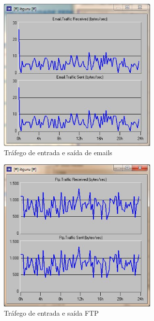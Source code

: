 \documentclass[brazil,times,12pt]{abnt}
\begin{document}
\begin{figure}[htp]
\begin{center}
  \includegraphics[width=80mm]{SimulacaoRede/TrafegoEmail.jpg}
  \caption[trafego-email]{Tráfego de entrada e saída de emails}
  \label{trafego-email}
\end{center}
\end{figure}

\begin{figure}[htp]
\begin{center}
  \includegraphics[width=80mm]{SimulacaoRede/TrafegoFTP.jpg}
  \caption[trafego-ftp]{Tráfego de entrada e saída FTP}
  \label{trafego-ftp}
\end{center}
\end{figure}
\end{document}
